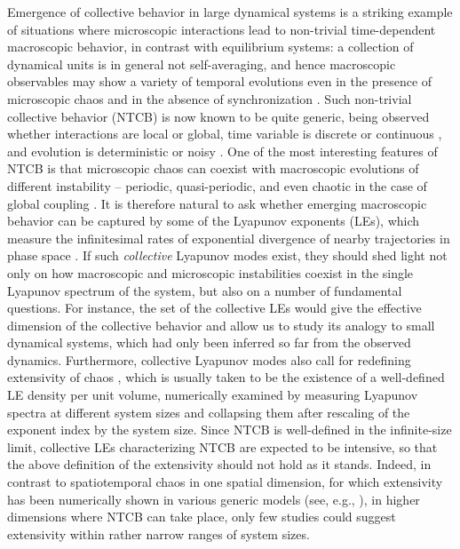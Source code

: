 \documentclass[12pt]{iopart}
\begin{document}
Emergence of collective behavior in large dynamical systems
 is a striking example of situations where microscopic interactions
 lead to non-trivial time-dependent macroscopic behavior, 
 in contrast with equilibrium systems:
 a collection of dynamical units is in general not self-averaging,
 and hence macroscopic observables may
 show a variety of temporal evolutions
 even in the presence of microscopic chaos and in the absence of synchronization
 \cite{Chate.Manneville-PTP1992,Kaneko-PRL1990,Pikovsky.Kurths-PRL1994,Kaneko-PD1995}.
Such non-trivial collective behavior (NTCB) is now known to be quite generic,
 being observed whether interactions are local or global,
 time variable is discrete or continuous
 \cite{Hakim.Rappel-PRA1992,Nakagawa.Kuramoto-PTP1993,Nakagawa.Kuramoto-PD1995,Brunnet.etal-PD1994},
 and evolution is deterministic or noisy
 \cite{Shibata.etal-PRL1999,DeMonte.etal-PRL2004,DeMonte.etal-PTPS2006}.
One of the most interesting features of NTCB
 is that microscopic chaos can coexist with macroscopic evolutions
 of different instability -- periodic, quasi-periodic, and even chaotic
 in the case of global coupling \cite{Bohr.etal-PRL1987,Kaneko-PD1995}.
It is therefore natural to ask whether emerging macroscopic behavior
 can be captured by some of the Lyapunov exponents (LEs),
 which measure the infinitesimal rates of exponential divergence
 of nearby trajectories in phase space \cite{Eckmann.Ruelle-RMP1985}.
If such \textit{collective} Lyapunov modes exist,
 they should shed light not only on
 how macroscopic and microscopic instabilities coexist
 in the single Lyapunov spectrum of the system,
 but also on a number of fundamental questions.
For instance, the set of the collective LEs
 would give the effective dimension of the collective behavior
 and allow us to study its analogy to small dynamical systems,
 which had only been inferred so far from the observed dynamics.
Furthermore, collective Lyapunov modes also call for redefining
 extensivity of chaos \cite{Ruelle-CMP1982},
 which is usually taken to be the existence of a well-defined LE density
 per unit volume, numerically examined by measuring Lyapunov spectra
 at different system sizes and collapsing them after rescaling
 of the exponent index by the system size.
Since NTCB is well-defined in the infinite-size limit,
 collective LEs characterizing NTCB are expected to be intensive,
 so that the above definition of the extensivity should not hold as it stands.
Indeed, in contrast to spatiotemporal chaos in one spatial dimension,
 for which extensivity has been numerically shown in various generic models
 (see, e.g., \cite{Manneville-LNP1985,Keefe-PLA1989,Livi.etal-JPA1986}),
 in higher dimensions where NTCB can take place,
 only few studies could suggest extensivity
 \cite{OHern.etal-PRE1996,Egolf.etal-N2000}
 within rather narrow ranges of system sizes.
\end{document}
